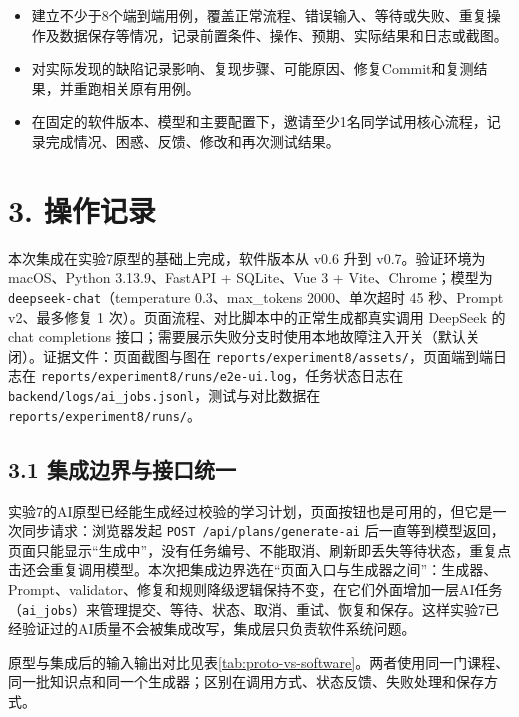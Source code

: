 \documentclass[UTF8,12pt,a4paper]{ctexart}
\begin{document}
\begin{itemize}
  \item 建立不少于8个端到端用例，覆盖正常流程、错误输入、等待或失败、重复操作及数据保存等情况，记录前置条件、操作、预期、实际结果和日志或截图。
  \item 对实际发现的缺陷记录影响、复现步骤、可能原因、修复Commit和复测结果，并重跑相关原有用例。
  \item 在固定的软件版本、模型和主要配置下，邀请至少1名同学试用核心流程，记录完成情况、困惑、反馈、修改和再次测试结果。
\end{itemize}

\section*{3. 操作记录}

本次集成在实验7原型的基础上完成，软件版本从 v0.6 升到 v0.7。验证环境为 macOS、Python 3.13.9、FastAPI + SQLite、Vue 3 + Vite、Chrome；模型为 \texttt{deepseek-chat}（temperature 0.3、max\_tokens 2000、单次超时 45 秒、Prompt v2、最多修复 1 次）。页面流程、对比脚本中的正常生成都真实调用 DeepSeek 的 chat completions 接口；需要展示失败分支时使用本地故障注入开关（默认关闭）。证据文件：页面截图与图在 \texttt{reports/experiment8/assets/}，页面端到端日志在 \texttt{reports/experiment8/runs/e2e-ui.log}，任务状态日志在 \texttt{backend/logs/ai\_jobs.jsonl}，测试与对比数据在 \texttt{reports/experiment8/runs/}。

\subsection*{3.1 集成边界与接口统一}

实验7的AI原型已经能生成经过校验的学习计划，页面按钮也是可用的，但它是一次同步请求：浏览器发起 \texttt{POST /api/plans/generate-ai} 后一直等到模型返回，页面只能显示“生成中”，没有任务编号、不能取消、刷新即丢失等待状态，重复点击还会重复调用模型。本次把集成边界选在“页面入口与生成器之间”：生成器、Prompt、validator、修复和规则降级逻辑保持不变，在它们外面增加一层AI任务（\texttt{ai\_jobs}）来管理提交、等待、状态、取消、重试、恢复和保存。这样实验7已经验证过的AI质量不会被集成改写，集成层只负责软件系统问题。

原型与集成后的输入输出对比见表\ref{tab:proto-vs-software}。两者使用同一门课程、同一批知识点和同一个生成器；区别在调用方式、状态反馈、失败处理和保存方式。
\end{document}
